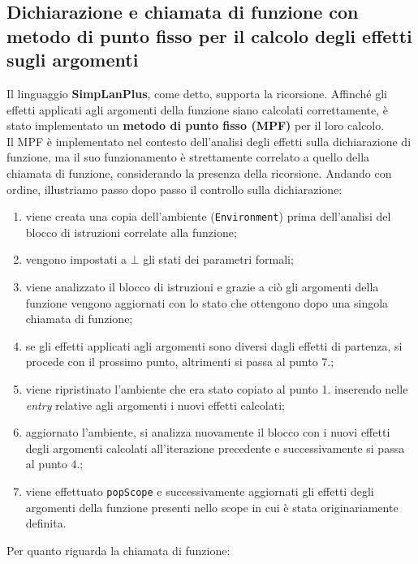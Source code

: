 \documentclass[../report.tex]{subfiles}
\begin{document}
\subsection{Dichiarazione e chiamata di funzione con metodo di punto fisso per il calcolo degli effetti sugli argomenti}\label{s:dichiarazione-chiamata-funzione-mpf}
Il linguaggio \textbf{SimpLanPlus}, come detto, supporta la ricorsione. Affinché gli effetti applicati agli argomenti della funzione siano calcolati correttamente, è stato implementato un \textbf{metodo di punto fisso (MPF)} per il loro calcolo.\\
\noindent
Il MPF è implementato nel contesto dell'analisi degli effetti sulla dichiarazione di funzione, ma il suo funzionamento è strettamente correlato a quello della chiamata di funzione, considerando la presenza della ricorsione.
Andando con ordine, illustriamo passo dopo passo il controllo sulla dichiarazione:
\begin{enumerate}
    \item viene creata una copia dell'ambiente (\verb|Environment|) prima dell'analisi del blocco di istruzioni correlate alla funzione;
    \item vengono impostati a $\bot{}$ gli stati dei parametri formali;
    \item viene analizzato il blocco di istruzioni e grazie a ciò gli argomenti della funzione vengono aggiornati con lo stato che ottengono dopo una singola chiamata di funzione;
    \item se gli effetti applicati agli argomenti sono diversi dagli effetti di partenza, si procede con il prossimo punto, altrimenti si passa al punto 7.;
    \item viene ripristinato l'ambiente che era stato copiato al punto 1. inserendo nelle \textit{entry} relative agli argomenti i nuovi effetti calcolati;
    \item aggiornato l'ambiente, si analizza nuovamente il blocco con i nuovi effetti degli argomenti calcolati all'iterazione precedente e successivamente si passa al punto 4.;
    \item viene effettuato \verb|popScope| e successivamente aggiornati gli effetti degli argomenti della funzione presenti nello scope in cui è stata originariamente definita.
\end{enumerate}
Per quanto riguarda la chiamata di funzione:
\end{document}
